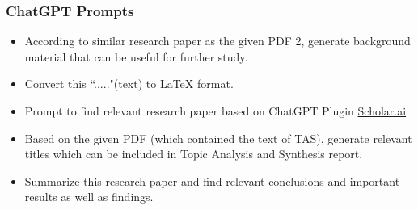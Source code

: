 \documentclass[runningheads]{llncs}
\begin{document}
\subsubsection{ChatGPT Prompts}
\begin{itemize}
    \item According to similar research paper as the given PDF 2, generate background material that can be useful for further study.
    \item Convert this ``....."(text) to LaTeX format.
    \item Prompt to find relevant research paper based on ChatGPT Plugin \hyperlink{https://scholarai.io/}{Scholar.ai}
    \item Based on the given PDF (which contained the text of TAS), generate relevant titles which can be included in Topic Analysis and Synthesis report.
    \item Summarize this research paper and find relevant conclusions and important results as well as findings.
\end{itemize}
\end{document}
